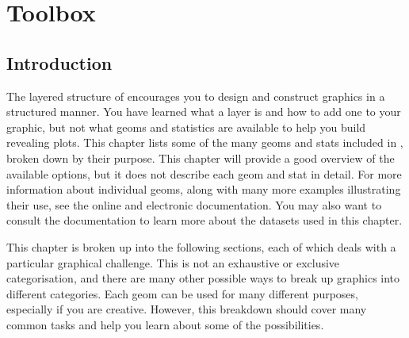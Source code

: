 

% 


\chapter{Toolbox}
\label{cha:toolbox}

\section{Introduction}

The layered structure of \ggplot encourages you to design and construct graphics in a structured manner. You have learned what a layer is and how to add one to your graphic, but not what geoms and statistics are available to help you build revealing plots. This chapter lists some of the many geoms and stats included in \ggplot, broken down by their purpose. This chapter will provide a good overview of the available options, but it does not describe each geom and stat in detail. For more information about individual geoms, along with many more examples illustrating their use, see the online and electronic documentation.  You may also want to consult the documentation to learn more about the datasets used in this chapter.

% 
% 
% 

This chapter is broken up into the following sections, each of which deals with a particular graphical challenge. This is not an exhaustive or exclusive categorisation, and there are many other possible ways to break up graphics into different categories. Each geom can be used for many different purposes, especially if you are creative. However, this breakdown should cover many common tasks and help you learn about some of the possibilities.

